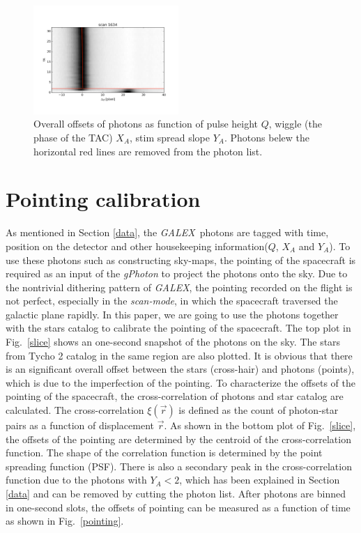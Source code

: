 \documentclass[12pt, preprint]{aastex}
\newcommand{\project}[1]{\textsl{#1}}
\newcommand{\galex}{\project{GALEX}}
\newcommand{\scanmode}{\project{scan-mode}}
\begin{document}
\begin{figure}[p]
\begin{center}
\includegraphics[width=0.49\textwidth]{figures/ya-y_tot}
\end{center}
\caption{%
  \label{meta}
  Overall offsets of photons as function of pulse height $Q$,  wiggle (the phase of the TAC)  $X_A$,  stim spread slope $Y_A$.
  Photons belew the horizontal red lines are removed from the photon list.
  }
\end{figure}

\section{Pointing calibration}
\label{pc}
As mentioned in Section \ref{data}, the \galex\ photons are tagged with time, position on the detector and other housekeeping information($Q$, $X_A$ and $Y_A$).
To use these photons such as constructing sky-maps, the pointing of the spacecraft is required as an input of the 
\project{gPhoton} to project the photons onto the sky.
Due to the nontrivial dithering pattern of \galex, the pointing recorded on the flight is not perfect, especially in the \scanmode, in which the spacecraft traversed the galactic plane rapidly. 
In this paper, we are going to use the photons together with the stars catalog to calibrate the pointing of the spacecraft.
The top plot in Fig.~\ref{slice} shows an one-second snapshot of the photons on the sky.
The stars from Tycho 2 catalog \citep{tycho2} in the same region are also plotted. 
It is obvious that there is an significant overall offset between the stars (cross-hair) and photons (points),  which is due to the imperfection of the pointing.
To characterize the offsets of the pointing of the spacecraft, the cross-correlation of photons and star catalog are calculated.
The cross-correlation $\xi(\vec{r})$ is defined as the count of photon-star pairs as a function of displacement $\vec{r}$.
As shown in the bottom plot of Fig.~\ref{slice}, the offsets of the pointing are determined by the centroid of the cross-correlation function. 
The shape of the correlation function is determined by the point spreading function (PSF).
There is also a secondary peak in the cross-correlation function due to the photons with $Y_A<2$, which has been explained in Section \ref{data} and can be removed by cutting the photon list.
After photons are binned in one-second slots, the offsets of pointing can be measured as a function of time as shown in Fig.~\ref{pointing}.
\end{document}

